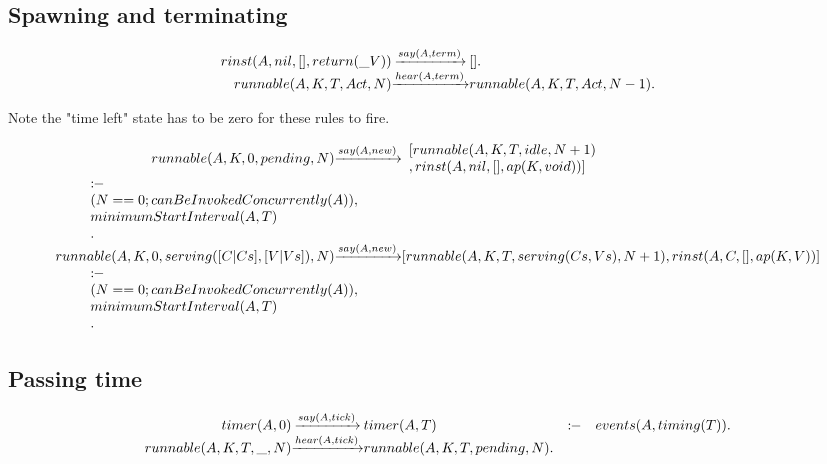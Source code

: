 \subsection{Spawning and terminating}

\[
\begin{array}{r@{}c@{}l}
  \Preduce{rinst(A, nil, [], return(\_V))}{say(A,term)}{[]}    .
\\\Preduce{runnable(A, K, T, Act, N)}{hear(A,term)}{runnable(A, K, T, Act, N-1)}.
\end{array}
\]

Note the "time left" state has to be zero for these rules to fire.

\[
\begin{array}{r@{}c@{}l}
  \Preduce{runnable(A, K, 0, pending, N)}{say(A,new)}{\begin{array}{l}
                                                        [ runnable(A, K, T, idle, N+1)
                                                      \\, rinst(A, nil, [], ap(K,void)) ]
                                                     \end{array}}
  \Pcontline{\begin{array}{l}
               \Pif
             \\(N == 0 ; canBeInvokedConcurrently(A)),
             \\minimumStartInterval(A, T)
             \\.
             \end{array}}
\\\Preduce{runnable(A, K, 0, serving([C|Cs],[V|Vs]), N)}{say(A,new)}{[ runnable(A, K, T, serving(Cs,Vs), N+1)
                                                                   , rinst(A, C, [], ap(K,V)) ]}
  \Pcontline{\begin{array}{l}
               \Pif
             \\(N == 0 ; canBeInvokedConcurrently(A)),
             \\minimumStartInterval(A, T)
             \\.
             \end{array}}
\end{array}
\]

\subsection{Passing time}


\[
\begin{array}{r@{}c@{}lcl}
  \Preduce{timer(A, 0)             }{say(A,tick)} {timer(A, T)}                   & \Pif&    events(A, timing(T))    .
\\\Preduce{runnable(A, K, T, \_, N)}{hear(A,tick)}{runnable(A, K, T, pending, N)} .
\end{array}
\]



